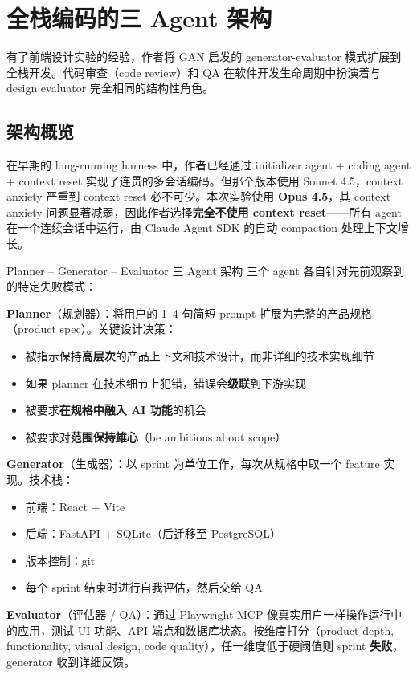 \documentclass[a4paper]{article}
\begin{document}
\section{全栈编码的三 Agent 架构}

有了前端设计实验的经验，作者将 GAN 启发的 generator-evaluator 模式扩展到全栈开发。代码审查（code review）和 QA 在软件开发生命周期中扮演着与 design evaluator 完全相同的结构性角色。

\subsection{架构概览}

在早期的 long-running harness 中，作者已经通过 initializer agent + coding agent + context reset 实现了连贯的多会话编码。但那个版本使用 Sonnet 4.5，context anxiety 严重到 context reset 必不可少。本次实验使用 \textbf{Opus 4.5}，其 context anxiety 问题显著减弱，因此作者选择\textbf{完全不使用 context reset}——所有 agent 在一个连续会话中运行，由 Claude Agent SDK 的自动 compaction 处理上下文增长。

\begin{importantbox}{Planner -- Generator -- Evaluator 三 Agent 架构}
三个 agent 各自针对先前观察到的特定失败模式：

\textbf{Planner}（规划器）：将用户的 1--4 句简短 prompt 扩展为完整的产品规格（product spec）。关键设计决策：
\begin{itemize}[leftmargin=1.5em]
    \item 被指示保持\textbf{高层次}的产品上下文和技术设计，而非详细的技术实现细节
    \item 如果 planner 在技术细节上犯错，错误会\textbf{级联}到下游实现
    \item 被要求\textbf{在规格中融入 AI 功能}的机会
    \item 被要求对\textbf{范围保持雄心}（be ambitious about scope）
\end{itemize}

\textbf{Generator}（生成器）：以 sprint 为单位工作，每次从规格中取一个 feature 实现。技术栈：
\begin{itemize}[leftmargin=1.5em]
    \item 前端：React + Vite
    \item 后端：FastAPI + SQLite（后迁移至 PostgreSQL）
    \item 版本控制：git
    \item 每个 sprint 结束时进行自我评估，然后交给 QA
\end{itemize}

\textbf{Evaluator}（评估器 / QA）：通过 Playwright MCP 像真实用户一样操作运行中的应用，测试 UI 功能、API 端点和数据库状态。按维度打分（product depth, functionality, visual design, code quality），任一维度低于硬阈值则 sprint \textbf{失败}，generator 收到详细反馈。
\end{importantbox}
\end{document}

